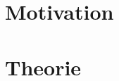 \section{Motivation}
\begin{quote}
	
	
	
\end{quote} %



\section{Theorie}
\begin{quote}

	
	
	\end{quote}%

